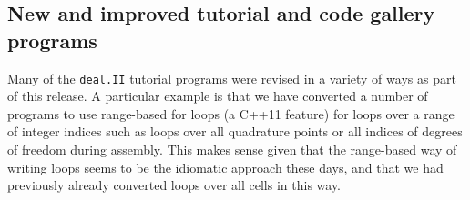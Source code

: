 \documentclass{ansarticle-preprint}
\newcommand{\specialword}[1]{\texttt{#1}}
\newcommand{\dealii}{{\specialword{deal.II}}\xspace}
\begin{document}
\subsection{New and improved tutorial and code gallery programs}
\label{subsec:steps}

Many of the \dealii{} tutorial programs were revised in a variety of
ways as part of this release. A particular example is that we have
converted a number of programs to use range-based for loops (a C++11
feature) for loops over a range of integer indices such as loops over
all quadrature points or all indices of degrees of freedom during
assembly. This makes sense given that the
range-based way of writing loops seems to be the idiomatic approach
these days, and that we had previously already converted loops over
all cells in this way.
\end{document}
